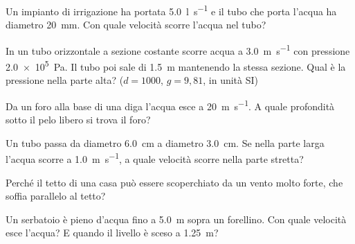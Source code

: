 \begin{esercizio}
Un impianto di irrigazione ha portata \SI{5,0}{\litre\per\second} e il tubo che porta l'acqua ha diametro \SI{20}{\milli\metre}. Con quale velocità scorre l'acqua nel tubo?\\
\end{esercizio}

\begin{esercizio}
In un tubo orizzontale a sezione costante scorre acqua a \SI{3,0}{\metre\per\second} con pressione \SI{2,0e5}{\pascal}. Il tubo poi sale di \SI{1,5}{\metre} mantenendo la stessa sezione. Qual è la pressione nella parte alta? ($d = 1000$, $g = 9{,}81$, in unità SI)\\
\end{esercizio}

\begin{esercizio}
Da un foro alla base di una diga l'acqua esce a \SI{20}{\metre\per\second}. A quale profondità sotto il pelo libero si trova il foro?\\
\end{esercizio}

\begin{esercizio}
Un tubo passa da diametro \SI{6,0}{\centi\metre} a diametro \SI{3,0}{\centi\metre}. Se nella parte larga l'acqua scorre a \SI{1,0}{\metre\per\second}, a quale velocità scorre nella parte stretta?\\
\end{esercizio}

\begin{esercizio}
Perché il tetto di una casa può essere scoperchiato da un vento molto forte, che soffia parallelo al tetto?\\
\end{esercizio}

\begin{esercizio}
Un serbatoio è pieno d'acqua fino a \SI{5,0}{\metre} sopra un forellino. Con quale velocità esce l'acqua? E quando il livello è sceso a \SI{1,25}{\metre}?\\
\end{esercizio}

